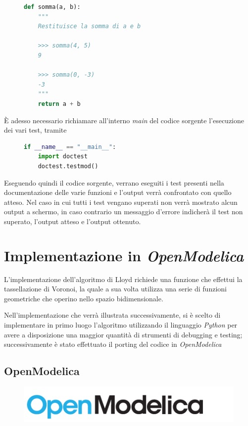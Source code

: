\documentclass[11pt,a4paper]{report}
\begin{document}
\begin{figure}[H]
\begin{lstlisting}[language=Python]
def somma(a, b):
	"""
	Restituisce la somma di a e b
	
	>>> somma(4, 5)
	9
	
	>>> somma(0, -3)
	-3
	"""
	return a + b
\end{lstlisting}
\end{figure}

È adesso necessario richiamare all'interno \textit{main} del codice sorgente l'esecuzione dei vari test, tramite

\begin{figure}[H]
\begin{lstlisting}[language=Python]
if __name__ == "__main__":
    import doctest
    doctest.testmod()
\end{lstlisting}
\end{figure}

Eseguendo quindi il codice sorgente, verrano eseguiti i test presenti nella documentazione delle varie funzioni e l'output verrà confrontato con quello atteso. Nel caso in cui tutti i test vengano superati non verrà mostrato alcun output a schermo, in caso contrario un messaggio d'errore indicherà il test non superato, l'output atteso e l'output ottenuto.

\pagebreak

\chapter{Implementazione in \textit{OpenModelica}}

L'implementazione dell'algoritmo di Lloyd richiede una funzione che effettui la tassellazione di Voronoi, la quale a sua volta utilizza una serie di funzioni geometriche che operino nello spazio bidimensionale.

Nell'implementazione che verrà illustrata successivamente, si è scelto di implementare in primo luogo l'algoritmo utilizzando il linguaggio \textit{Python} per avere a disposizione una maggior quantità di strumenti di debugging e testing; successivamente è stato effettuato il porting del codice in \textit{OpenModelica}

\section{OpenModelica}

\begin{figure}[H]
\centering
\includegraphics[scale=0.5]{openmodelica.png}
\end{figure}
\end{document}

